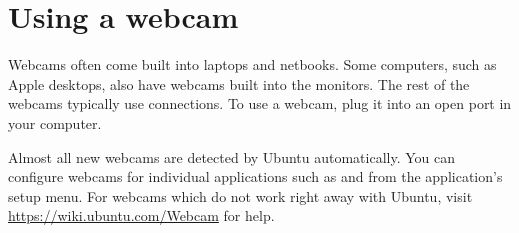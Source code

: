 \section{Using a webcam}

Webcams often come built into laptops and netbooks. Some computers, such as Apple desktops, also have webcams built into the monitors. The rest of the webcams typically use  connections. To use a  webcam, plug it into an open  port in your computer. 

Almost all new webcams are detected by Ubuntu automatically. You can configure webcams for individual applications such as  and  from the application's setup menu. For webcams which do not work right away with Ubuntu, visit \url{https://wiki.ubuntu.com/Webcam} for help.

